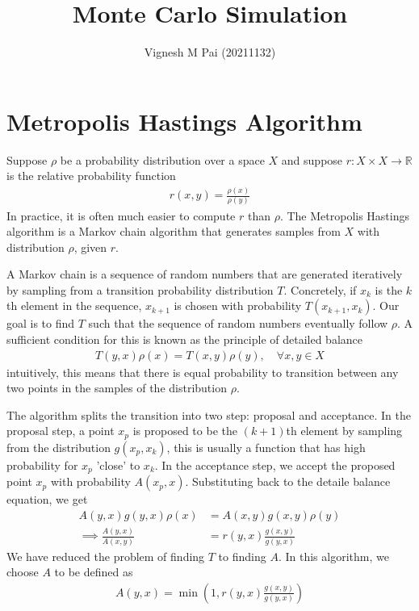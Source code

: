 \documentclass{article}
\title{Monte Carlo Simulation}
\author{Vignesh M Pai (20211132)}
\date{}
\begin{document}
\maketitle

\section{Metropolis Hastings Algorithm}

Suppose $\rho$ be a probability distribution over a space $X$
and suppose $r: X \times X \to \mathbb{R}$ is the relative probability function
\begin{align*}
    r(x, y) = \frac{\rho(x)}{\rho(y)}
\end{align*}
In practice, it is often much easier to compute $r$ than $\rho$.
The Metropolis Hastings algorithm is a Markov chain algorithm that generates samples from $X$ with distribution $\rho$, given $r$.

A Markov chain is a sequence of random numbers that are generated iteratively by sampling from a transition probability distribution $T$.
Concretely, if $x_k$ is the $k$th element in the sequence, $x_{k+1}$ is chosen with probability $T(x_{k + 1}, x_k)$. Our goal is to find $T$
such that the sequence of random numbers eventually follow $\rho$. A sufficient condition for this is known as the principle of detailed balance
\begin{align*}
    T(y, x) \rho(x) = T(x, y) \rho(y),\quad \forall x, y \in X
\end{align*}
intuitively, this means that there is equal probability to transition between any two points in the samples of the distribution $\rho$.

The algorithm splits the transition into two step: proposal and acceptance. In the proposal step, a point $x_p$ is proposed to be the $(k+1)$th element
by sampling from the distribution $g(x_p, x_k)$, this is usually a function that has high probability for $x_p$ 'close' to $x_k$. In the acceptance step,
we accept the proposed point $x_p$ with probability $A(x_p, x)$. Substituting back to the detaile balance equation, we get
\begin{align*}
    A(y, x) g(y, x) \rho(x) &= A(x, y) g(x, y) \rho(y) \\
    \implies \frac{A(y, x)}{A(x, y)} &= r(y, x) \frac{g(x, y)}{g(y, x)}
\end{align*}
We have reduced the problem of finding $T$ to finding $A$. In this algorithm, we choose $A$ to be defined as
\begin{align*}
    A(y, x) = \min\left(1, r(y, x) \frac{g(x, y)}{g(y, x)}\right)
\end{align*}
\end{document}
